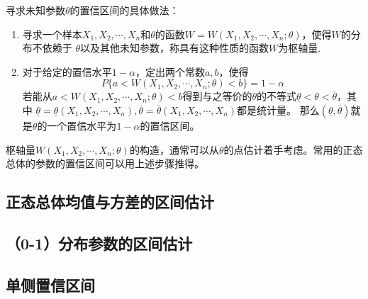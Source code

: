 \begin{theorem}
    寻求未知参数$\theta$的置信区间的具体做法：
    \begin{enumerate}[1°]
        \item 寻求一个样本$X_1,X_2,\cdots,X_n$和$\theta$的函数$W=W(X_1,X_2,\cdots,X_n;\theta)$，使得$W$的分布不依赖于
        $\theta$以及其他未知参数，称具有这种性质的函数$W$为{\heiti 枢轴量}.
        \item 对于给定的置信水平$1-\alpha$，定出两个常数$a,b$，使得
        $$P\{a<W(X_1,X_2,\cdots,X_n;\theta)<b\}=1-\alpha$$
        若能从$a<W(X_1,X_2,\cdots,X_n;\theta)<b$得到与之等价的$\theta$的不等式$\underline{\theta}<\theta<\overline{\theta}$，其中
        $\underline{\theta}=\underline{\theta}(X_1,X_2,\cdots,X_n),\overline{\theta}=\overline{\theta}(X_1,X_2,\cdots,X_n)$都是统计量。
        那么$(\underline{\theta},\overline{\theta})$就是$\theta$的一个置信水平为$1-\alpha$的置信区间。
    \end{enumerate}
    
    枢轴量$W(X_1,X_2,\cdots,X_n;\theta)$的构造，通常可以从$\theta$的点估计着手考虑。常用的正态总体的参数的置信区间可以用上述步骤推得。
\end{theorem}

\subsection{正态总体均值与方差的区间估计}




\subsection{（0-1）分布参数的区间估计}


\subsection{单侧置信区间}

